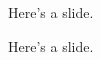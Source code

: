 \documentclass{beamer}
\begin{document}
\begin{frame}[t]
\titlepage
\end{frame}
\begin{frame}
%
Here's a slide.
\end{frame}
\begin{frame}
%
Here's a slide.
\end{frame}
\end{document}
